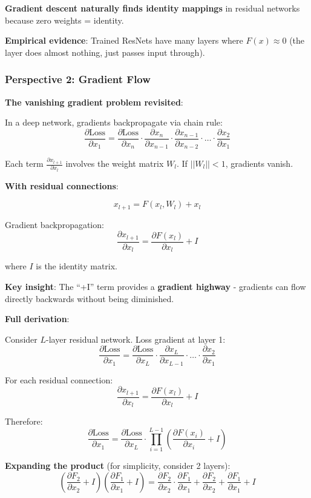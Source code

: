 \textbf{Gradient descent naturally finds identity mappings} in residual networks because zero weights = identity.

\textbf{Empirical evidence}: Trained ResNets have many layers where $F(x) \approx 0$ (the layer does almost nothing, just passes input through).

\subsubsection{Perspective 2: Gradient Flow}

\textbf{The vanishing gradient problem revisited}:

In a deep network, gradients backpropagate via chain rule:
\[
\frac{\partial \text{Loss}}{\partial x_1} = \frac{\partial \text{Loss}}{\partial x_n} \cdot \frac{\partial x_n}{\partial x_{n-1}} \cdot \frac{\partial x_{n-1}}{\partial x_{n-2}} \cdot \ldots \cdot \frac{\partial x_2}{\partial x_1}
\]

Each term $\frac{\partial x_{l+1}}{\partial x_l}$ involves the weight matrix $W_l$. If $||W_l|| < 1$, gradients vanish.

\textbf{With residual connections}:

\[
x_{l+1} = F(x_l, W_l) + x_l
\]

Gradient backpropagation:
\[
\frac{\partial x_{l+1}}{\partial x_l} = \frac{\partial F(x_l)}{\partial x_l} + I
\]

where $I$ is the identity matrix.

\textbf{Key insight}: The ``+I'' term provides a \textbf{gradient highway} - gradients can flow directly backwards without being diminished.

\textbf{Full derivation}:

Consider $L$-layer residual network. Loss gradient at layer 1:
\[
\frac{\partial \text{Loss}}{\partial x_1} = \frac{\partial \text{Loss}}{\partial x_L} \cdot \frac{\partial x_L}{\partial x_{L-1}} \cdot \ldots \cdot \frac{\partial x_2}{\partial x_1}
\]

For each residual connection:
\[
\frac{\partial x_{l+1}}{\partial x_l} = \frac{\partial F(x_l)}{\partial x_l} + I
\]

Therefore:
\[
\frac{\partial \text{Loss}}{\partial x_1} = \frac{\partial \text{Loss}}{\partial x_L} \cdot \prod_{i=1}^{L-1} \left(\frac{\partial F(x_i)}{\partial x_i} + I\right)
\]

\textbf{Expanding the product} (for simplicity, consider 2 layers):
\[
\left(\frac{\partial F_2}{\partial x_2} + I\right)\left(\frac{\partial F_1}{\partial x_1} + I\right) = \frac{\partial F_2}{\partial x_2} \cdot \frac{\partial F_1}{\partial x_1} + \frac{\partial F_2}{\partial x_2} + \frac{\partial F_1}{\partial x_1} + I
\]

